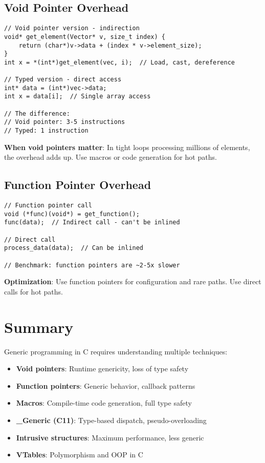 \subsection{Void Pointer Overhead}

\begin{lstlisting}
// Void pointer version - indirection
void* get_element(Vector* v, size_t index) {
    return (char*)v->data + (index * v->element_size);
}
int x = *(int*)get_element(vec, i);  // Load, cast, dereference

// Typed version - direct access
int* data = (int*)vec->data;
int x = data[i];  // Single array access

// The difference:
// Void pointer: 3-5 instructions
// Typed: 1 instruction
\end{lstlisting}

\textbf{When void pointers matter}: In tight loops processing millions of elements, the overhead adds up. Use macros or code generation for hot paths.

\subsection{Function Pointer Overhead}

\begin{lstlisting}
// Function pointer call
void (*func)(void*) = get_function();
func(data);  // Indirect call - can't be inlined

// Direct call
process_data(data);  // Can be inlined

// Benchmark: function pointers are ~2-5x slower
\end{lstlisting}

\textbf{Optimization}: Use function pointers for configuration and rare paths. Use direct calls for hot paths.

\section{Summary}

Generic programming in C requires understanding multiple techniques:

\begin{itemize}
    \item \textbf{Void pointers}: Runtime genericity, loss of type safety
    \item \textbf{Function pointers}: Generic behavior, callback patterns
    \item \textbf{Macros}: Compile-time code generation, full type safety
    \item \textbf{\_Generic (C11)}: Type-based dispatch, pseudo-overloading
    \item \textbf{Intrusive structures}: Maximum performance, less generic
    \item \textbf{VTables}: Polymorphism and OOP in C
\end{itemize}


